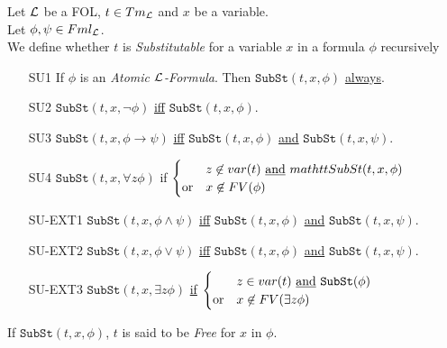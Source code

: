\documentclass[11pt,a4paper]{article}
\begin{document}





Let $\mathcal{L}$ be a FOL, $t\in Tm_{\mathcal{L}}$ and $x$ be a variable.\\
Let $\phi,\psi\in Fml_{\mathcal{L}}$.\\
We define whether $t$ is \textit{Substitutable} for a variable $x$ in a formula $\phi$ recursively
\begin{itemize}
	\item[SU1] If $\phi$ is an \textit{Atomic $\mathcal{L}$-Formula}. Then $\mathtt{SubSt}(t,x,\phi)$ \underline{always}.
	\item[SU2] $\mathtt{SubSt}(t,x,\neg\phi)$ \underline{iff} $\mathtt{SubSt}(t,x,\phi)$.
	\item[SU3] $\mathtt{SubSt}(t,x,\phi\to\psi)$ \underline{iff} $\mathtt{SubSt}(t,x,\phi)$ \underline{and} $\mathtt{SubSt}(t,x,\psi)$.
	\item[SU4] $\mathtt{SubSt}(t,x,\forall z\phi)$ if $\begin{cases}&z\not\in var(t)\text{ \underline{and}\ }mathtt{SubSt}(t,x,\phi)\\\text{or}&x\not\in FV(\phi)\end{cases}$
	\item[SU-EXT1] $\mathtt{SubSt}(t,x,\phi\wedge\psi)$ \underline{iff} $\mathtt{SubSt}(t,x,\phi)$ \underline{and} $\mathtt{SubSt}(t,x,\psi)$.
	\item[SU-EXT2] $\mathtt{SubSt}(t,x,\phi\vee\psi)$ \underline{iff} $\mathtt{SubSt}(t,x,\phi)$ \underline{and} $\mathtt{SubSt}(t,x,\psi)$.
	\item[SU-EXT3] $\mathtt{SubSt}(t,x,\exists z\phi)$ \underline{if} $\begin{cases}&z\in var(t)\text{ \underline{and} }\mathtt{SubSt}(\phi)\\\text{or}&x\not\in FV(\exists z\phi)\end{cases}$
\end{itemize}
\nb If $\mathtt{SubSt}(t,x,\phi)$, $t$ is said to be \textit{Free} for $x$ in $\phi$.\\
\end{document}
